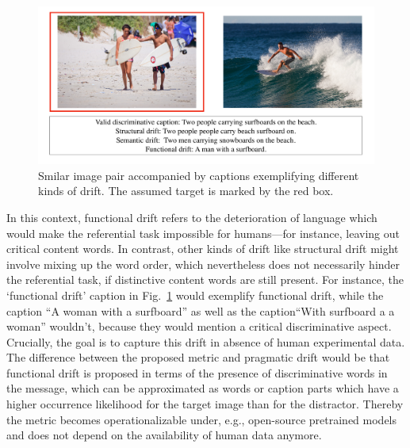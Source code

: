 \begin{figure}[h]
	\centering
	\includegraphics[width=0.9\linewidth]{images/COCO_drift_example_cropped.pdf}
	\caption{Smilar image pair accompanied by captions exemplifying different kinds of drift. The assumed target is marked by the red box.}
	\label{fig:coco_drift_example}
\end{figure}

In this context, functional drift refers to the deterioration of language which would make the referential task impossible for humans---for instance, leaving out critical content words. 
In contrast, other kinds of drift like structural drift might involve mixing up the word order, which nevertheless does not necessarily hinder the referential task, if distinctive content words are still present. For instance, the `functional drift' caption in Fig.~\ref{fig:coco_drift_example} would exemplify functional drift, while the caption ``A woman with a surfboard'' as well as the caption``With surfboard a a woman'' wouldn't, because they would mention a critical discriminative aspect. 
Crucially, the goal is to capture this drift in absence of human experimental data. The difference between the proposed metric and pragmatic drift would be that functional drift is proposed in terms of the presence of discriminative words in the message, which can be approximated as words or caption parts which have a higher occurrence likelihood for the target image than for the distractor. Thereby the metric becomes operationalizable under, e.g., open-source pretrained models and does not depend on the availability of human data anymore. 

